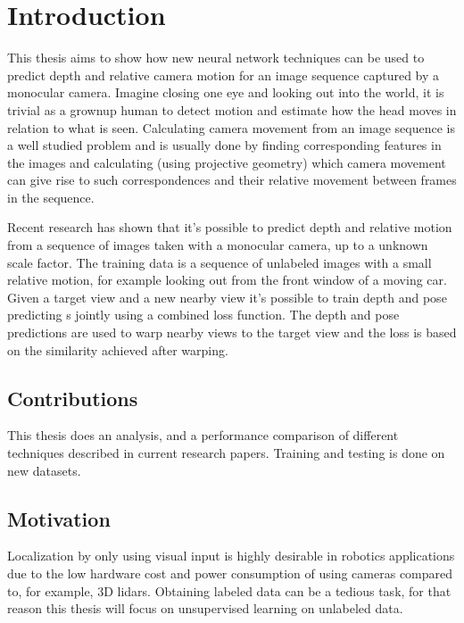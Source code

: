 \chapter{Introduction}\label{cha:introduction}

This thesis aims to show how new neural network techniques can be used to predict depth and relative camera motion for an image sequence captured by a monocular \abbrRGB camera. Imagine closing one eye and looking out into the world, it is trivial as a grownup human to detect motion and estimate how the head moves in relation to what is seen. Calculating camera movement from an image sequence is a well studied problem and is usually done by finding corresponding features in the images and calculating (using projective geometry) which camera movement can give rise to such correspondences and their relative movement between frames in the sequence.

Recent research has shown that it's possible to predict depth and relative motion from a sequence of images taken with a monocular \abbrRGB camera, up to a unknown scale factor. The training data is a sequence of unlabeled images with a small relative motion, for example looking out from the front window of a moving car. Given a target view and a new nearby view it's possible to train depth and pose predicting \abbrCNN{}s jointly using a combined loss function. The depth and pose predictions are used to warp nearby views to the target view and the loss is based on the similarity achieved after warping.

\section{Contributions}

This thesis does an analysis, and a performance comparison of different techniques described in current research papers. Training and testing is done on new datasets.

\section{Motivation}

Localization by only using visual input is highly desirable in robotics applications due to the low hardware cost and power consumption of using cameras compared to, for example, 3D lidars. Obtaining labeled data can be a tedious task, for that reason this thesis will focus on unsupervised learning on unlabeled data.

